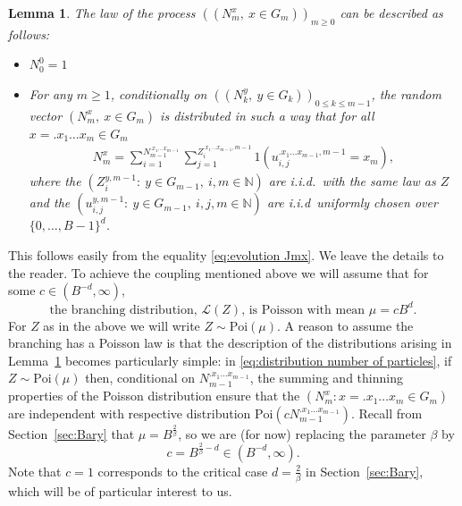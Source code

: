 \documentclass[12pt]{article}
\makeatletter
\renewenvironment{proof}[1][\proofname]{%
\par\pushQED{\qed}\normalfont%
\topsep6\p@\@plus6\p@\relax
\trivlist\item[\hskip\labelsep\bfseries#1\@addpunct{.}]%
\ignorespaces
}{%
\popQED\endtrivlist\@endpefalse
}
\numberwithin{theorem}{section}
\newtheorem{lemma}[theorem]{Lemma}
\theoremstyle{def}
\numberwithin{equation}{section}
\newcommand{\N}{\mathbb{N}}
\newcommand{\cL}{\mathcal{L}}
\makeatother
\begin{document}
\begin{lemma}\label{lem:evolution number of particles}
The law of the process $((N_m^x, \ x\in G_m))_{m\geq 0}$ can be described as follows:
\begin{itemize}
	\item $N_0^0=1$
	\item For any $m\geq 1$, conditionally on $((N_k^y, \ y\in G_k))_{0 \leq k \leq m-1}$, the random vector $(N_m^x, \ x\in G_m)$ is distributed in such a way that for all $x=.x_1\dots x_{m}\in G_{m}$ 
		\begin{align}\label{eq:distribution number of particles}
		 N_m^x=\sum_{i=1}^{N_{m-1}^{.x_1\dots x_{m-1}}}\sum_{j=1}^{Z_i^{.x_1\dots x_{m-1},m-1}} 1(u_{i,j}^{.x_1\dots x_{m-1},m-1}= x_m),
		\end{align} 
	where the $(Z_i^{y,m-1} : \ y\in G_{m-1},\ i,m\in\N)$ are i.i.d.\ with the same law as $Z$ and the $(u_{i,j}^{y,m-1} :\ y\in G_{m-1},\ i,j,m\in\N)$ are i.i.d\ uniformly chosen over $\{0,\dots,B-1\}^d$. 
\end{itemize}  
\end{lemma}
\begin{proof}
This follows easily from the equality \eqref{eq:evolution Jmx}. We leave the details to the reader.
\end{proof}
To achieve the coupling mentioned above we will assume that for some $c\in(B^{-d},\infty)$,
\begin{equation}\label{Poisson}
	\text{the branching distribution, $\cL(Z)$, is Poisson with mean $\mu=cB^d$.}
\end{equation}
For $Z$ as in the above we will write $Z\sim \mathrm{Poi}(\mu)$.
A reason to assume the branching has a Poisson law is that the description of the distributions arising in Lemma~\ref{lem:evolution number of particles} becomes particularly simple: in \eqref{eq:distribution number of particles}, if $Z\sim \mathrm{Poi}(\mu)$ then, conditional on $N_{m-1}^{.x_1\dots x_{m-1}}$,  the summing and thinning properties of the Poisson distribution ensure that the $(N_m^{x}  : x=.x_1\dots x_{m}\in G_m)$ are independent with respective distribution $\mathrm{Poi}(c N_{m-1}^{.x_1\dots x_{m-1}})$.
Recall from Section~\ref{sec:Bary} that $\mu=B^{\frac{2}{\beta}}$, so we are (for now) replacing the parameter $\beta$ by 
\begin{equation}\label{cbeta}
c=B^{\frac{2}{\beta}-d}\in(B^{-d},\infty).
\end{equation}
Note that $c=1$ corresponds to the critical case $d=\frac{2}{\beta}$ in Section~\ref{sec:Bary}, which will be of particular interest to us. 
\end{document}
